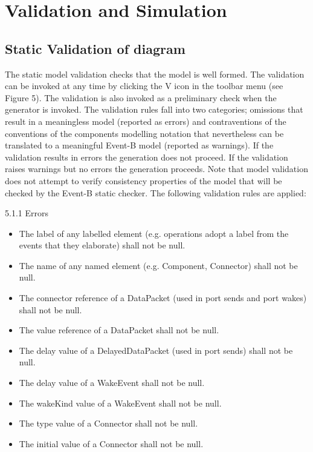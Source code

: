 \section{Validation and Simulation}
\label{sec:component_diagrams-validation}

\subsection{Static Validation of diagram}
The static model validation checks that the model is well formed. The validation can be invoked at any time by clicking the V icon in the toolbar menu (see Figure 5). The validation is also invoked as a preliminary check when the generator is invoked. The validation rules fall into two categories; omissions that result in a meaningless model (reported as errors) and contraventions of the conventions of the components modelling notation that nevertheless can be translated to a meaningful Event-B model (reported as warnings). If the validation results in errors the generation does not proceed. If the validation raises warnings but no errors the generation proceeds. Note that model validation does not attempt to verify consistency properties of the model that will be checked by the Event-B static checker. The following validation rules are applied:

5.1.1	Errors

\begin{itemize}
\item The label of any labelled element (e.g. operations adopt a label from the events that they elaborate) shall not be null.
\item The name of any named element (e.g. Component, Connector) shall not be null.
\item The connector reference of a DataPacket (used in port sends and port wakes) shall not be null.
\item The value reference of a DataPacket shall not be null.
\item The delay value of a DelayedDataPacket (used in port sends) shall not be null.
\item The delay value of a WakeEvent shall not be null.
\item The wakeKind value of a WakeEvent shall not be null.
\item The type value of a Connector shall not be null.
\item The initial value of a Connector shall not be null.
\end{itemize}



